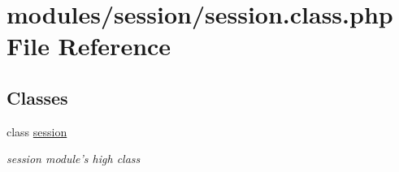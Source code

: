 \hypertarget{session_8class_8php}{\section{modules/session/session.class.\+php File Reference}
\label{session_8class_8php}
}
\subsection*{Classes}
\begin{DoxyCompactItemize}
\item 
class \hyperlink{classsession}{session}
\begin{DoxyCompactList}\small\item\em session module's high class \end{DoxyCompactList}\end{DoxyCompactItemize}
